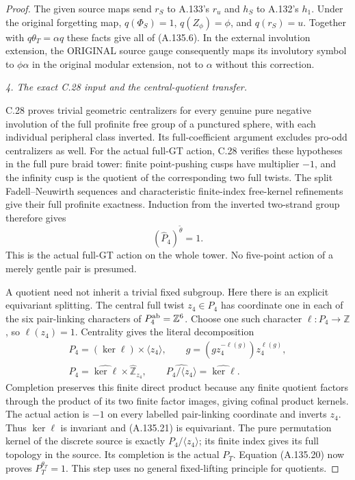 \begin{proof}
The given source maps send \(r_S\) to A.133's \(r_u\) and
\(h_S\) to A.132's \(h_1\). Under the original forgetting map,
\(q(\Phi_S)=1\), \(q(Z_\phi)=\phi\), and \(q(r_S)=u\).
Together with \(q\theta_T=\alpha q\) these facts give all of
(A.135.6). In the external involution extension, the ORIGINAL
source gauge consequently maps its involutory symbol to
\(\phi\alpha\) in the original modular extension, not to
\(\alpha\) without this correction.

\emph{4. The exact C.28 input and the central-quotient transfer.}\par
C.28 proves trivial geometric centralizers for every genuine pure
negative involution of the full profinite free group of a punctured
sphere, with each individual peripheral class inverted. Its
full-coefficient argument excludes pro-odd centralizers as well.
For the actual full-GT action, C.28 verifies these hypotheses in
the full pure braid tower: finite point-pushing cusps have multiplier
\(-1\), and the infinity cusp is the quotient of the corresponding
two full twists. The split Fadell--Neuwirth sequences and
characteristic finite-index free-kernel refinements give their full
profinite exactness. Induction from the inverted two-strand group
therefore gives
\[
                  (\widehat P_4)^{\widetilde\theta}=1.
 \tag{A.135.20}
\]
This is the actual full-GT action on the whole tower. No five-point
action of a merely gentle pair is presumed.

A quotient need not inherit a trivial fixed subgroup. Here there
is an explicit equivariant splitting. The central full twist
\(z_4\in P_4\) has coordinate one in each of the six pair-linking
characters of \(P_4^{\rm ab}=\mathbb Z^6\). Choose one such
character \(\ell:P_4\to\mathbb Z\), so \(\ell(z_4)=1\).
Centrality gives the literal decomposition
\[
 \begin{gathered}
 P_4=(\ker\ell)\times\langle z_4\rangle,\qquad
 g=(gz_4^{-\ell(g)})z_4^{\ell(g)},\\
 \widehat P_4=\widehat{\ker\ell}\times
                   \widehat{\mathbb Z}_{z_4},\qquad
 \widehat{P_4/\langle z_4\rangle}=\widehat{\ker\ell}.
 \end{gathered}
 \tag{A.135.21}
\]
Completion preserves this finite direct product because any finite
quotient factors through the product of its two finite factor
images, giving cofinal product kernels. The actual action is
\(-1\) on every labelled pair-linking coordinate and inverts
\(z_4\). Thus \(\ker\ell\) is invariant and (A.135.21) is
equivariant. The pure permutation kernel of the discrete source is
exactly \(P_4/\langle z_4\rangle\); its finite index gives its
full topology in the source. Its completion is the actual \(P_T\).
Equation (A.135.20) now proves \(P_T^{\theta_T}=1\).
This step uses no general fixed-lifting principle for quotients.


\end{proof}
